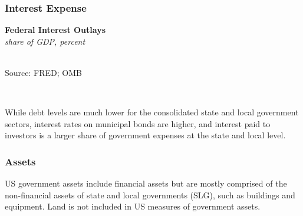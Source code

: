 \documentclass{report}
\makeatletter
\newcommand{\tbllink}[1]{\href{https://raw.githubusercontent.com/bdecon/US-chartbook/master/chartbook/data/#1}{\faTable}}
\newcommand*\short[1]{\expandafter\@gobbletwo\number\numexpr#1\relax}
\newcommand{\shdateaxisticks}{
		date coordinates in=x, axis line style={draw=none},
		xmax={2021-02-01},
		max space between ticks=40,	    
		xtick={{1990-01-01}, {1995-01-01}, {2000-01-01}, 
			{2005-01-01}, {2010-01-01}, {2015-01-01}, {2020-01-01}},
		minor xtick={},
		enlarge y limits={0.06}, enlarge x limits={0.01},
		}
\newcommand{\thickline}[4]{\addplot[ultra thick, no markers, color=#1] 
		table [x=#2, y=#3, col sep=comma] {#4};	}
\newcommand{\rbars}{
		\fill[color=black!10] (axis cs:{1990-07-01},\pgfkeysvalueof{/pgfplots/ymin}) rectangle 
			(axis cs:{1991-03-01}, \pgfkeysvalueof{/pgfplots/ymax});
		\fill[color=black!10] (axis cs:{2007-12-01},\pgfkeysvalueof{/pgfplots/ymin}) rectangle 
			(axis cs:{2009-07-01}, \pgfkeysvalueof{/pgfplots/ymax});
		\fill[color=black!10] (axis cs:{2001-03-01},\pgfkeysvalueof{/pgfplots/ymin}) rectangle 
			(axis cs:{2001-11-01}, \pgfkeysvalueof{/pgfplots/ymax});}
\makeatother
\begin{document}
{{{{{{{\subsubsection*{\color{black!70} \seriffont Interest Expense}

\begin{minipage}{0.34\textwidth}
\small 
\end{minipage} \hspace{6mm} \begin{minipage}{0.35\textwidth}
\noindent \normalsize \textbf{Federal Interest Outlays}\\
\footnotesize{\textit{share of GDP, percent}}\\
\noindent \hspace*{-2mm} \\
\footnotesize{Source: FRED; OMB} \hfill \tbllink{fedintexp.csv}

\end{minipage} \\
\vspace{1mm}

\begin{minipage}{0.76\textwidth}
\small While debt levels are much lower for the consolidated state and local government sectors, interest rates on municipal bonds are higher, and interest paid to investors is a larger share of government expenses at the state and local level.
\end{minipage}


\newpage

\subsubsection*{\color{black!70} \seriffont Assets}

\begin{minipage}{0.76\textwidth}

\small US government assets include financial assets but are mostly comprised of the non-financial assets of state and local governments (SLG), such as buildings and equipment. Land is not included in US measures of government assets. \\


\end{minipage}}}}}}}}
\end{document}
